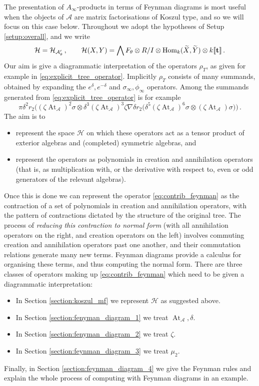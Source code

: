 \documentclass[english,letter paper,12pt,leqno]{article}
\theoremstyle{example}
\numberwithin{equation}{section}
\def\AA{\mathcal{A}}
\def\HH{\HH}
\def\HH{\mathcal{H}}
\def\Hom{\operatorname{Hom}}
\def\be{\begin{equation}}
\def\ee{\end{equation}}
\DeclareMathOperator{\vAt}{At}
\begin{document}
The presentation of $A_\infty$-products in terms of Feynman diagrams is most useful when the objects of $\AA$ are matrix factorisations of Koszul type, and so we will focus on this case below. Throughout we adopt the hypotheses of Setup \ref{setup:overall}, and we write
\be\label{eq:hhalt_koszul}
\HH = \HH_{\AA'_\theta}\,, \qquad \HH(X,Y) = \bigwedge F_\theta \otimes R/I \otimes \Hom_k(\widetilde{X},\widetilde{Y}) \otimes k\llbracket \bold{t} \rrbracket\,.
\ee
Our aim is give a diagrammatic interpretation of the operators $\rho_T$, as given for example in \eqref{eq:explicit_tree_operator}. Implicitly $\rho_T$ consists of many summands, obtained by expanding the $e^{\delta}, e^{-\delta}$ and $\sigma_\infty, \phi_\infty$ operators. Among the summands generated from \eqref{eq:explicit_tree_operator} is for example
\be\label{eq:contrib_feynman}
\pi \delta^2 r_2\Big( (\zeta \vAt_{\AA})^2 \sigma \otimes \delta^3 (\zeta \vAt_{\AA})^3 \zeta \nabla \delta r_2\Big( \delta^5 (\zeta \vAt_{\AA})^6 \sigma \otimes (\zeta \vAt_{\AA}) \sigma \Big) \Big)\,.
\ee
The aim is to
\begin{itemize}
\item represent the space $\HH$ on which these operators act as a tensor product of exterior algebras and (completed) symmetric algebras, and
\item represent the operators as polynomials in creation and annihilation operators (that is, as multiplication with, or the derivative with respect to, even or odd generators of the relevant algebras).
\end{itemize}
Once this is done we can represent the operator \eqref{eq:contrib_feynman} as the contraction of a set of polynomials in creation and annihilation operators, with the pattern of contractions dictated by the structure of the original tree. The process of \emph{reducing this contraction to normal form} (with all annihilation operators on the right, and creation operators on the left) involves commuting creation and annihilation operators past one another, and their commutation relations generate many new terms. Feynman diagrams provide a calculus for organising these terms, and thus computing the normal form. There are three classes of operators making up \eqref{eq:contrib_feynman} which need to be given a diagrammatic interpretation:
\begin{itemize}
\item In Section \ref{section:koszul_mf} we represent $\HH$ as suggested above.
\item In Section \ref{section:fenyman_diagram_1} we treat $\vAt_{\AA}, \delta$.
\item In Section \ref{section:fenyman_diagram_2} we treat $\zeta$.
\item In Section \ref{section:feynman_diagram_3} we treat $\mu_2$.
\end{itemize}
Finally, in Section \ref{section:feynman_diagram_4} we give the Feynman rules and explain the whole process of computing with Feynman diagrams in an example.
\end{document}
